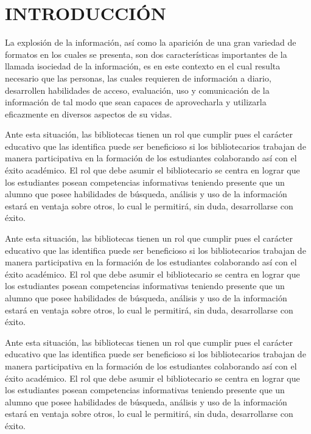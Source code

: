 \chapter{INTRODUCCI\'ON}

  La explosión de la información, así como la aparición de una gran variedad de
  formatos en los cuales se presenta, son dos características importantes de la
  llamada isociedad de la información, es en este contexto en el cual resulta
  necesario que las personas, las cuales requieren de información a diario,
  desarrollen habilidades de acceso, evaluación, uso y comunicación de la
  información de tal modo que sean capaces de aprovecharla y utilizarla
  eficazmente en diversos aspectos de su vidas.

  Ante esta situación, las bibliotecas tienen un rol que cumplir pues el
  carácter educativo que las identifica puede ser beneficioso si los
  bibliotecarios trabajan de manera participativa en la formación de los
  estudiantes colaborando así con el éxito académico. El rol que debe asumir el
  bibliotecario se centra en lograr que los estudiantes posean competencias
  informativas teniendo presente que un alumno que posee habilidades de
  búsqueda, análisis y uso de la información estará en ventaja sobre otros, lo
  cual le permitirá, sin duda, desarrollarse con éxito.

  Ante esta situación, las bibliotecas tienen un rol que cumplir pues el
  carácter educativo que las identifica puede ser beneficioso si los
  bibliotecarios trabajan de manera participativa en la formación de los
  estudiantes colaborando así con el éxito académico. El rol que debe asumir el
  bibliotecario se centra en lograr que los estudiantes posean competencias
  informativas teniendo presente que un alumno que posee habilidades de
  búsqueda, análisis y uso de la información estará en ventaja sobre otros, lo
  cual le permitirá, sin duda, desarrollarse con éxito.

  Ante esta situación, las bibliotecas tienen un rol que cumplir pues el
  carácter educativo que las identifica puede ser beneficioso si los
  bibliotecarios trabajan de manera participativa en la formación de los
  estudiantes colaborando así con el éxito académico. El rol que debe asumir el
  bibliotecario se centra en lograr que los estudiantes posean competencias
  informativas teniendo presente que un alumno que posee habilidades de
  búsqueda, análisis y uso de la información estará en ventaja sobre otros, lo
  cual le permitirá, sin duda, desarrollarse con éxito.


